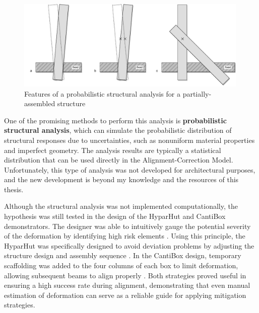 \begin{figure}[h]
    \centering
    \includegraphics[width=0.99\textwidth]{images/09/Nondeterministic Alignment Target.pdf}
    \caption{Features of a probabilistic structural analysis for a partially-assembled structure}
    \label{fig:probabilistic-structural-analysis}
\end{figure}

One of the promising methods to perform this analysis is \textbf{probabilistic structural analysis}, which can simulate the probabilistic distribution of structural responses due to uncertainties, such as nonuniform material properties and imperfect geometry\parencite{cruseProbabilisticStructuralAnalysis1988, kohlerProbabilisticModelingTimber2007}. The analysis results are typically a statistical distribution that can be used directly in the Alignment-Correction Model. Unfortunately, this type of analysis was not developed for architectural purposes, and the new development is beyond my knowledge and the resources of this thesis.

Although the structural analysis was not implemented computationally, the hypothesis was still tested in the design of the HyparHut and CantiBox demonstrators. The designer was able to intuitively gauge the potential severity of the deformation by identifying high risk elements . Using this principle, the HyparHut was specifically designed to avoid deviation problems by adjusting the structure design and assembly sequence . In the CantiBox design, temporary scaffolding was added to the four columns of each box to limit deformation, allowing subsequent beams to align properly . Both strategies proved useful in ensuring a high success rate during alignment, demonstrating that even manual estimation of deformation can serve as a reliable guide for applying mitigation strategies.

